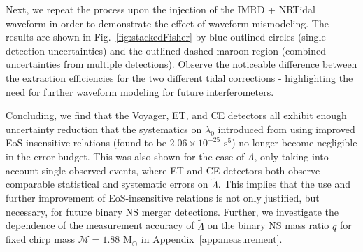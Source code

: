 \documentclass[prd,twocolumn,nofootinbib,superscriptaddress,amsmath,amssymb]{revtex4-1}
\begin{document}
Next, we repeat the process upon the injection of the IMRD + NRTidal waveform in order to demonstrate the effect of waveform mismodeling.
The results are shown in Fig.~\ref{fig:stackedFisher} by blue outlined circles (single detection uncertainties) and the outlined dashed maroon region (combined uncertainties from multiple detections).
Observe the noticeable difference between the extraction efficiencies for the two different tidal corrections - highlighting the need for further waveform modeling for future interferometers.

{}

Concluding, we find that the Voyager, ET, and CE detectors all exhibit enough uncertainty reduction that the systematics on $\lambda_0$ introduced from using improved EoS-insensitive relations (found to be $2.06 \times 10^{-25}\text{ s}^5$) no longer become negligible in the error budget.
This was also shown for the case of $\tilde\Lambda$, only taking into account single observed events, where ET and CE detectors both observe comparable statistical and systematic errors on $\tilde\Lambda$.
This implies that the use and further improvement of EoS-insensitive relations is not only justified, but necessary, for future binary NS merger detections.
Further, we investigate the dependence of the measurement accuracy of $\tilde\Lambda$ on the binary NS mass ratio $q$ for fixed chirp mass $\mathcal{M}=1.88\text{ M}_{\odot}$ in Appendix~\ref{app:measurement}.

\end{document}
